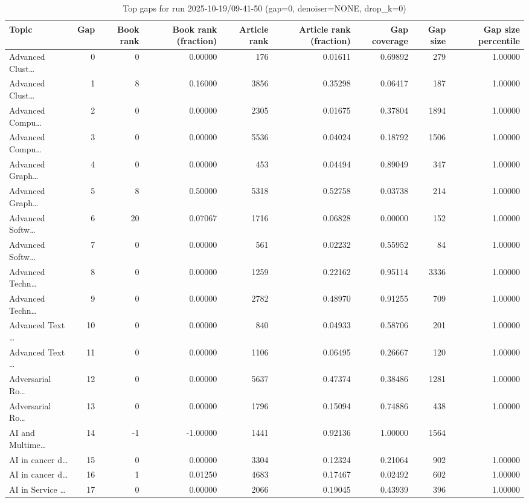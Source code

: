 \begin{table}
\caption{Top gaps for run 2025-10-19/09-41-50 (gap=0, denoiser=NONE, drop\_k=0)}
\label{tab:best_run_gap0_2025_10_19_09_41_50}
\begin{tabular}{lrrrrrrrr}
\toprule
Topic & Gap & Book rank & Book rank (fraction) & Article rank & Article rank (fraction) & Gap coverage & Gap size & Gap size percentile \\
\midrule
Advanced Clust… & 0 & 0 & 0.00000 & 176 & 0.01611 & 0.69892 & 279 & 1.00000 \\
Advanced Clust… & 1 & 8 & 0.16000 & 3856 & 0.35298 & 0.06417 & 187 & 1.00000 \\
Advanced Compu… & 2 & 0 & 0.00000 & 2305 & 0.01675 & 0.37804 & 1894 & 1.00000 \\
Advanced Compu… & 3 & 0 & 0.00000 & 5536 & 0.04024 & 0.18792 & 1506 & 1.00000 \\
Advanced Graph… & 4 & 0 & 0.00000 & 453 & 0.04494 & 0.89049 & 347 & 1.00000 \\
Advanced Graph… & 5 & 8 & 0.50000 & 5318 & 0.52758 & 0.03738 & 214 & 1.00000 \\
Advanced Softw… & 6 & 20 & 0.07067 & 1716 & 0.06828 & 0.00000 & 152 & 1.00000 \\
Advanced Softw… & 7 & 0 & 0.00000 & 561 & 0.02232 & 0.55952 & 84 & 1.00000 \\
Advanced Techn… & 8 & 0 & 0.00000 & 1259 & 0.22162 & 0.95114 & 3336 & 1.00000 \\
Advanced Techn… & 9 & 0 & 0.00000 & 2782 & 0.48970 & 0.91255 & 709 & 1.00000 \\
Advanced Text … & 10 & 0 & 0.00000 & 840 & 0.04933 & 0.58706 & 201 & 1.00000 \\
Advanced Text … & 11 & 0 & 0.00000 & 1106 & 0.06495 & 0.26667 & 120 & 1.00000 \\
Adversarial Ro… & 12 & 0 & 0.00000 & 5637 & 0.47374 & 0.38486 & 1281 & 1.00000 \\
Adversarial Ro… & 13 & 0 & 0.00000 & 1796 & 0.15094 & 0.74886 & 438 & 1.00000 \\
AI and Multime… & 14 & -1 & -1.00000 & 1441 & 0.92136 & 1.00000 & 1564 &  \\
AI in cancer d… & 15 & 0 & 0.00000 & 3304 & 0.12324 & 0.21064 & 902 & 1.00000 \\
AI in cancer d… & 16 & 1 & 0.01250 & 4683 & 0.17467 & 0.02492 & 602 & 1.00000 \\
AI in Service … & 17 & 0 & 0.00000 & 2066 & 0.19045 & 0.43939 & 396 & 1.00000 \\

\end{tabular}
\end{table}
